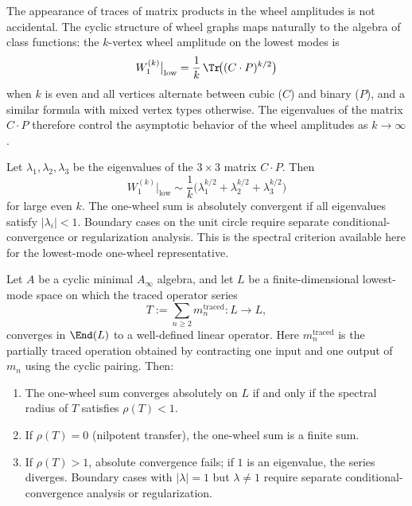 \begin{remark}
The appearance of traces of matrix products in the wheel amplitudes is not accidental.
The cyclic structure of wheel graphs maps naturally to the algebra of class functions:
the $k$-vertex wheel amplitude on the lowest modes is
\begin{equation}
W_1^{(k)}\big|_{\mathrm{low}} = \frac{1}{k}\, \Tr\!\bigl((C \cdot P)^{k/2}\bigr)
\end{equation}
when $k$ is even and all vertices alternate between cubic ($C$) and binary ($P$),
and a similar formula with mixed vertex types otherwise. The eigenvalues of the
matrix $C \cdot P$ therefore control the asymptotic behavior of the wheel amplitudes
as $k \to \infty$.

Let $\lambda_1, \lambda_2, \lambda_3$ be the eigenvalues of the $3 \times 3$ matrix
$C \cdot P$. Then
\[
W_1^{(k)}\big|_{\mathrm{low}} \sim
\frac{1}{k}\bigl(\lambda_1^{k/2} + \lambda_2^{k/2} + \lambda_3^{k/2}\bigr)
\]
for large even $k$. The one-wheel sum is absolutely convergent if all eigenvalues
satisfy $|\lambda_i| < 1$. Boundary cases on the unit circle require separate
conditional-convergence or regularization analysis. This is the spectral criterion
available here for the lowest-mode one-wheel representative.
\end{remark}

\begin{theorem}
\label{thm:spectral-one-wheel-convergence}
Let $A$ be a cyclic minimal $A_\infty$ algebra, and let $L$ be a finite-dimensional
lowest-mode space on which the traced operator series
\begin{equation}
T := \sum_{n \geq 2} m_n^{\mathrm{traced}} : L \longrightarrow L,
\end{equation}
converges in $\End(L)$ to a well-defined linear operator. Here
$m_n^{\mathrm{traced}}$ is the partially traced operation obtained by
contracting one input and one output of $m_n$ using the cyclic pairing. Then:
\begin{enumerate}[label=\textup{(\roman*)}]
\item The one-wheel sum converges absolutely on $L$ if and only if
 the spectral radius of $T$ satisfies $\rho(T) < 1$.
\item If $\rho(T) = 0$ (nilpotent transfer), the one-wheel sum is a finite sum.
\item If $\rho(T) > 1$, absolute convergence fails; if $1$ is an eigenvalue, the
 series diverges. Boundary cases with $|\lambda| = 1$ but $\lambda \neq 1$
 require separate conditional-convergence analysis or regularization.
\end{enumerate}
\end{theorem}

